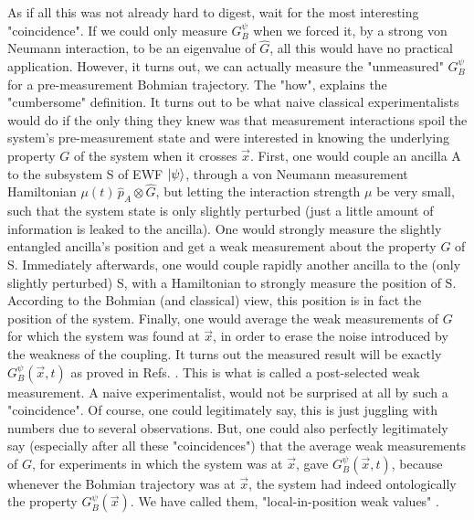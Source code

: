 \documentclass[11pt, a4paper]{article} %
\begin{document}
As if all this was not already hard to digest, wait for the most interesting "coincidence". If we could only measure $G_B^\psi$ when we forced it, by a strong von Neumann interaction, to be an eigenvalue of $\hat{G}$, all this would have no practical application. However, it turns out, we can actually measure the "unmeasured" $G_B^\psi$ for a pre-measurement Bohmian trajectory. The "how", explains the "cumbersome" definition. It turns out to be what naive classical experimentalists \cite{WisemanVel} would do if the only thing they knew was that measurement interactions spoil the system's pre-measurement state and were interested in knowing the underlying property $G$ of the system when it crosses $\vec{x}$. First, one would couple an ancilla A to the subsystem S of EWF $\ket{\psi}$, through a von Neumann measurement Hamiltonian $\mu(t)\,\hat{p}_A\otimes\hat{G}$, but letting the interaction strength $\mu$ be very small, such that the system state is only slightly perturbed (just a little amount of information is leaked to the ancilla). One would strongly measure the slightly entangled ancilla's position and get a weak measurement about the property $G$ of S. Immediately afterwards, one would couple rapidly another ancilla to the (only slightly perturbed) S, with a Hamiltonian to strongly measure the position of S. According to the Bohmian (and classical) view, this position is in fact the position of the system. Finally, one would average the weak measurements of $G$ for which the system was found at $\vec{x}$, in order to erase the noise introduced by the weakness of the coupling. It turns out the measured result will be exactly $G^\psi_B(\vec{x},t)$ as proved in Refs. \cite{Weak, DevInPosition1}. This is what is called a post-selected weak measurement. A naive experimentalist, would not be surprised at all by such a "coincidence". Of course, one could legitimately say, this is just juggling with numbers due to several observations. But, one could also perfectly legitimately say (especially after all these "coincidences") that the average weak measurements of $G$, for experiments in which the system was at $\vec{x}$, gave $G^\psi_B(\vec{x},t)$, because whenever the Bohmian trajectory was at $\vec{x}$, the system had indeed ontologically the property $G^\psi_B(\vec{x})$. We have called them, "local-in-position weak values" \cite{DevInPosition1, DevInPosition2}. \vspace{-0.3cm}

\end{document}
